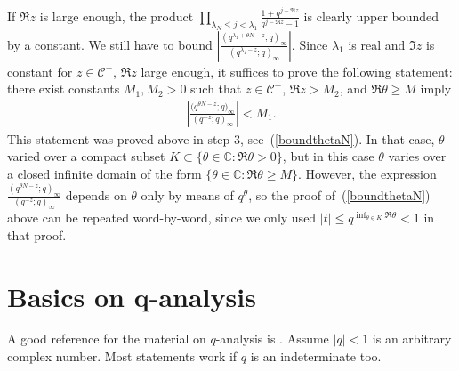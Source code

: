 \documentclass[11pt]{article}
\numberwithin{equation}{section}
\newcommand{\C}{\mathbb{C}}
\newcommand{\CC}{\mathcal{C}}
\begin{document}
If $\Re z$ is large enough, the product $\prod\limits_{\lambda_N \leq j < \lambda_1}{\frac{1 + q^{j - \Re z}}{q^{j - \Re z} - 1}}$ is clearly upper bounded by a constant. We still have to bound $\left|\frac{(q^{\lambda_1 + \theta N - z}; q)_{\infty}}{(q^{\lambda_1 - z}; q)_{\infty}}\right|$. Since $\lambda_1$ is real and $\Im z$ is constant for $z\in\CC^+$, $\Re z$ large enough, it suf\/f\/ices to prove the following statement: there exist constants $M_1, M_2 > 0$ such that $z\in\CC^+$, $\Re z > M_2$, and $\Re\theta \geq M$ imply
\begin{gather*}
\left| \frac{\big(q^{\theta N - z}; q\big)_{\infty}}{(q^{-z}; q)_{\infty}} \right| < M_1.
\end{gather*}
This statement was proved above in step 3, see~(\ref{boundthetaN}). In that case, $\theta$ varied over a compact subset $K\subset\{\theta\in\C\colon \Re\theta > 0\}$, but in this case $\theta$ varies over a closed inf\/inite domain of the form $\{\theta\in\C\colon \Re\theta \geq M\}$. However, the expression $\frac{(q^{\theta N - z}; q)_{\infty}}{(q^{-z}; q)_{\infty}}$ depends on $\theta$ only by means of $q^{\theta}$, so the proof of~(\ref{boundthetaN}) above can be repeated word-by-word, since we only used $|t|\leq q^{\inf_{\theta\in K}{\Re\theta}}< 1$ in that proof.



\setcounter{section}{7}
\setcounter{subsection}{4}
\setcounter{subsubsection}{0}
\setcounter{thm}{11}
\setcounter{equation}{23}
\appendix

\section[Basics on $q$-analysis]{Basics on $\boldsymbol{q}$-analysis}\label{app:qtheory}


A good reference for the material on $q$-analysis is \cite[Chapter~10]{AAR}. Assume $|q| < 1$ is an arbitrary complex number. Most statements work if $q$ is an indeterminate too.
\end{document}

